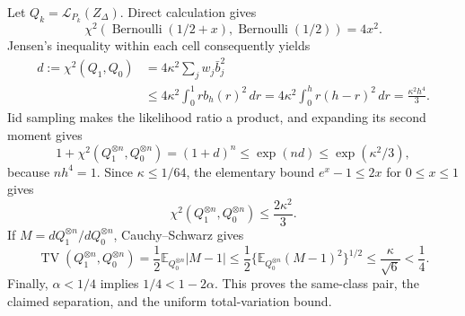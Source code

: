 Let \(Q_k=\mathcal L_{P_k}(Z_\Delta)\).  Direct calculation gives
\[
 \chi^2\!\left(\operatorname{Bernoulli}(1/2+x),\operatorname{Bernoulli}(1/2)\right)=4x^2.
\]
Jensen's inequality within each cell consequently yields
\[
 \begin{aligned}
 d:=\chi^2(Q_1,Q_0)
 &=4\kappa^2\sum_jw_j\bar b_j^2\\
 &\leq4\kappa^2\int_0^1rb_h(r)^2\,dr
 =4\kappa^2\int_0^h r(h-r)^2\,dr
 =\frac{\kappa^2h^4}{3}.
 \end{aligned}
\]
Iid sampling makes the likelihood ratio a product, and expanding its second moment gives
\[
 1+\chi^2(Q_1^{\otimes n},Q_0^{\otimes n})=(1+d)^n
 \leq\exp(nd)\leq\exp(\kappa^2/3),
\]
because \(nh^4=1\).  Since \(\kappa\leq1/64\), the elementary bound \(e^x-1\leq2x\) for \(0\leq x\leq1\) gives
\[
 \chi^2(Q_1^{\otimes n},Q_0^{\otimes n})\leq\frac{2\kappa^2}{3}.
\]
If \(M=dQ_1^{\otimes n}/dQ_0^{\otimes n}\), Cauchy--Schwarz gives
\[
 \operatorname{TV}(Q_1^{\otimes n},Q_0^{\otimes n})
 =\frac12\mathbb E_{Q_0^{\otimes n}}|M-1|
 \leq\frac12\{\mathbb E_{Q_0^{\otimes n}}(M-1)^2\}^{1/2}
 \leq\frac\kappa{\sqrt6}<\frac14.
\]
Finally, \(\alpha<1/4\) implies \(1/4<1-2\alpha\).  This proves the same-class pair, the claimed separation, and the uniform total-variation bound.
